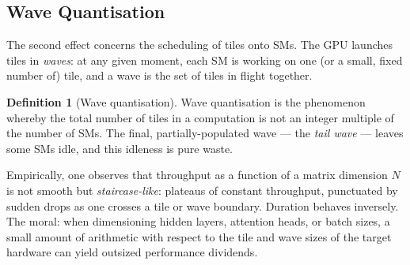 \documentclass[11pt,a4paper]{article}
\theoremstyle{definition}
\newtheorem{definition}{Definition}[section]
\theoremstyle{remark}
\theoremstyle{plain}
\begin{document}
\subsection{Wave Quantisation}

The second effect concerns the scheduling of tiles onto SMs. The
GPU launches tiles in \emph{waves}: at any given moment, each SM is
working on one (or a small, fixed number of) tile, and a wave is the
set of tiles in flight together.

\begin{definition}[Wave quantisation]
Wave quantisation is the phenomenon whereby the total number of
tiles in a computation is not an integer multiple of the number of
SMs. The final, partially-populated wave --- the \emph{tail wave}
--- leaves some SMs idle, and this idleness is pure waste.
\end{definition}

\begin{center}
\end{center}

Empirically, one observes that throughput as a function of a matrix
dimension $N$ is not smooth but \emph{staircase-like}: plateaus of
constant throughput, punctuated by sudden drops as one crosses a
tile or wave boundary. Duration behaves inversely. The moral: when
dimensioning hidden layers, attention heads, or batch sizes, a small
amount of arithmetic with respect to the tile and wave sizes of the
target hardware can yield outsized performance dividends.

\end{document}
